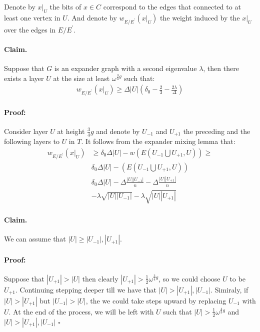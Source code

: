 \documentclass{article}
\begin{document}
\begin{multicols*}{2}
Denote by $x|_{U}$ the bits of $x\in C$ correspond to the edges that connected to at least one vertex in $U$. And denote by $w_{E/E^{\prime}}\left( x|_{U} \right)$ the weight induced by the $x|_{U}$ over the edges in $E/E^\prime$.
\paragraph{Claim.} Suppose that $G$ is an expander graph with a second eigenvalue $\lambda$, then there exists a layer $U$ at the size at least $\omega^{ \frac{3}{4}g }$ such that:
\begin{equation*}
  \begin{split}
    w_{E/E^{\prime}}\left( x|_{U} \right)\ge\Delta|U|\left( \delta_{0}-\frac{2}{3}-\frac{2\lambda}{\Delta} \right)
  \end{split}
\end{equation*}
\paragraph{Proof:} Consider layer $U$ at height $\frac{3}{4}g$ and denote by $U_{-1}$ and $U_{+1}$ the preceding and the following layers to $U$ in $T$. It follows from the expander mixing lemma that:
\begin{equation*}
  \begin{split}
    w_{E/E^{\prime}}\left( x|_{U} \right) & \ge \delta_{0}\Delta|U| -w\left( E(U_{-1} \bigcup U_{+1} ,U)  \right) \ge \\ 
    & \delta_{0}\Delta|U| -\left( E(U_{-1} \bigcup U_{+1} ,U)  \right) \\ 
    &  \delta_{0}\Delta|U| - \Delta\frac{|U||U_{-1}|}{n} - \Delta\frac{|U||U_{+1}|}{n} \\
    & -\lambda\sqrt{|U||U_{-1}|} - \lambda\sqrt{|U||U_{+1}|}
  \end{split}
\end{equation*}

\paragraph{Claim.} We can assume that $|U| \ge |U_{-1}|, |U_{+1}|$. 
\paragraph{Proof:} Suppose that $|U_{+1}| > |U|$ then clearly $|U_{+1}| > \frac{1}{2}\omega^{\frac{3}{4}g} $, so we could choose $U$ to be $U_{+1}$. Continuing stepping deeper till we have that $|U| > |U_{+1}|, |U_{-1}|$. Simiraly, if $|U| > |U_{+1}|$ but $|U_{-1}| > |U|$, the we could take steps upward by replacing $U_{-1}$ with $U$. At the end of the process, we will be left with $U$ such that $|U| > \frac{1}{2}\omega^{\frac{4}{3}g}$ and $|U| > |U_{+1}|, |U_{-1}|$ $\square$


\end{multicols*}
\end{document}
